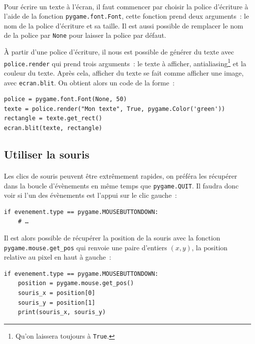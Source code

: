 \paragraph{}
Pour écrire un texte à l'écran, il faut commencer par choisir la police d'écriture à l'aide de la fonction \texttt{pygame.font.Font}, cette fonction prend deux arguments~: le nom de la police d'écriture et sa taille.
Il est aussi possible de remplacer le nom de la police par \texttt{None} pour laisser la police par défaut.

À partir d'une police d'écriture, il nous est possible de générer du texte avec \texttt{police.render} qui prend trois arguments~: le texte à afficher, antialiasing\footnote{Qu'on laissera toujours à \texttt{True}.} et la couleur du texte.
Après cela, afficher du texte se fait comme afficher une image, avec \texttt{ecran.blit}.
On obtient alors un code de la forme~:
\begin{verbatim}
police = pygame.font.Font(None, 50)
texte = police.render("Mon texte", True, pygame.Color('green'))
rectangle = texte.get_rect()
ecran.blit(texte, rectangle)
\end{verbatim}

\subsection{Utiliser la souris}
\label{sec:souris}

\paragraph{}
Les clics de souris peuvent être extrêmement rapides, on préféra les récupérer dans la boucle d'évènements en même temps que \texttt{pygame.QUIT}.
Il faudra donc voir si l'un des évènements est l'appui sur le clic gauche~:
\begin{verbatim}
if evenement.type == pygame.MOUSEBUTTONDOWN:
    # …
\end{verbatim}

Il est alors possible de récupérer la position de la souris avec la fonction \texttt{pygame.mouse.get\_pos} qui renvoie une paire d'entiers \((x, y)\), la position relative au pixel en haut à gauche~:
\begin{verbatim}
if evenement.type == pygame.MOUSEBUTTONDOWN:
    position = pygame.mouse.get_pos()
    souris_x = position[0]
    souris_y = position[1]
    print(souris_x, souris_y)
\end{verbatim}

